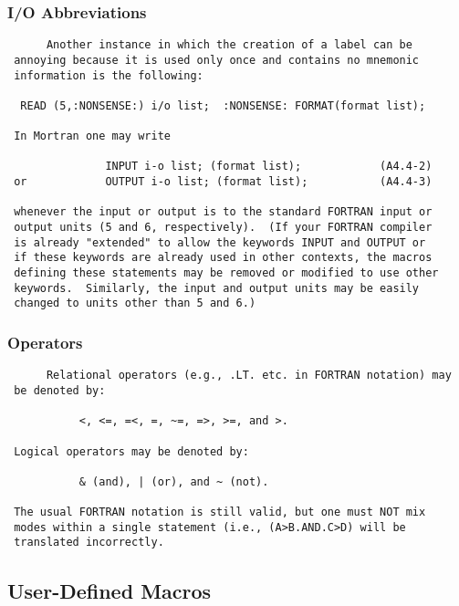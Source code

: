  \subsubsection{I/O Abbreviations}
 \begin{verbatim}
      Another instance in which the creation of a label can be
 annoying because it is used only once and contains no mnemonic
 information is the following:

  READ (5,:NONSENSE:) i/o list;  :NONSENSE: FORMAT(format list);

 In Mortran one may write

               INPUT i-o list; (format list);            (A4.4-2)
 or            OUTPUT i-o list; (format list);           (A4.4-3)

 whenever the input or output is to the standard FORTRAN input or
 output units (5 and 6, respectively).  (If your FORTRAN compiler
 is already "extended" to allow the keywords INPUT and OUTPUT or
 if these keywords are already used in other contexts, the macros
 defining these statements may be removed or modified to use other
 keywords.  Similarly, the input and output units may be easily
 changed to units other than 5 and 6.)
 \end{verbatim}
 \subsubsection{Operators}
 \begin{verbatim}
      Relational operators (e.g., .LT. etc. in FORTRAN notation) may
 be denoted by:

           <, <=, =<, =, ~=, =>, >=, and >.

 Logical operators may be denoted by:

           & (and), | (or), and ~ (not).

 The usual FORTRAN notation is still valid, but one must NOT mix
 modes within a single statement (i.e., (A>B.AND.C>D) will be
 translated incorrectly.
 \end{verbatim}
 \subsection{User-Defined Macros}
